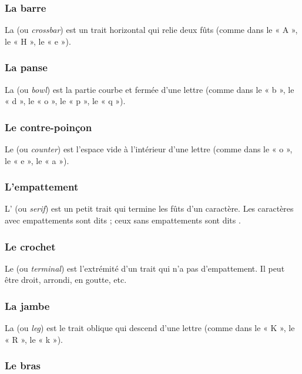 \subsubsection{La barre}

La  (ou \emph{crossbar}) est un trait horizontal qui relie deux fûts (comme dans le « A », le « H », le « e »).

\subsubsection{La panse}

La  (ou \emph{bowl}) est la partie courbe et fermée d'une lettre (comme dans le « b », le « d », le « o », le « p », le « q »).

\subsubsection{Le contre-poinçon}

Le  (ou \emph{counter}) est l'espace vide à l'intérieur d'une lettre (comme dans le « o », le « e », le « a »).

\subsubsection{L'empattement}

L' (ou \emph{serif}) est un petit trait qui termine les fûts d'un caractère. Les caractères avec empattements sont dits  ; ceux sans empattements sont dits .

\subsubsection{Le crochet}

Le  (ou \emph{terminal}) est l'extrémité d'un trait qui n'a pas d'empattement. Il peut être droit, arrondi, en goutte, etc.

\subsubsection{La jambe}

La  (ou \emph{leg}) est le trait oblique qui descend d'une lettre (comme dans le « K », le « R », le « k »).

\subsubsection{Le bras}

